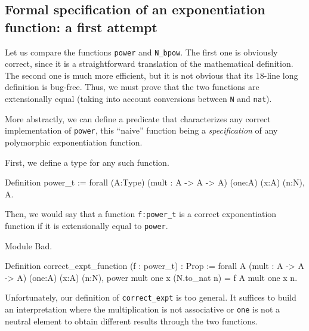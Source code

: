 



\subsection{Formal specification of an exponentiation function: a first attempt}

Let us compare the functions \texttt{power} and \texttt{N\_bpow}.
The first one is obviously correct, since it is a straightforward translation of the mathematical definition.
The second one is much more efficient, but it is not obvious  that its 18-line long definition is bug-free.
Thus, we must prove that the two functions are extensionally equal (taking into account conversions
between \texttt{N} and \texttt{nat}).

More abstractly, we can define a predicate that characterizes any correct implementation 
of \texttt{power}, this ``naive''  function being a \emph{specification} of any polymorphic
exponentiation function.

First, we define a type for any such function.

\begin{Coqsrc}
Definition power_t := forall (A:Type)
                             (mult : A -> A -> A)
                             (one:A)
                             (x:A)
                             (n:N), A.
\end{Coqsrc}

Then, we would say that a function \texttt{f:power\_t} is a correct exponentiation function if it
is extensionally equal to \texttt{power}.

\begin{Coqbad}
Module Bad.

 Definition correct_expt_function (f : power_t) : Prop :=
  forall A (mult : A -> A -> A) (one:A)
            (x:A) (n:N), 
            power mult one x (N.to_nat n) = f A mult one x n.
\end{Coqbad}


Unfortunately, our definition of \texttt{correct\_expt} is too general. It suffices to build 
an interpretation where the multiplication is not associative or \texttt{one} is not a neutral
element to obtain different results through the two functions.



